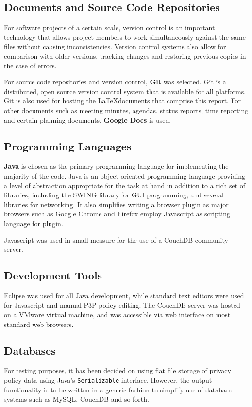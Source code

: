 \subsection{Documents and Source Code Repositories}
For software projects of a certain scale, version control is an important technology that allows project members to work simultaneously against the same files without causing inconsistencies. Version control systems also allow for comparison with older versions, tracking changes and restoring previous copies in the case of errors.

For source code repositories and version control, \textbf{Git} was selected. Git is a distributed, open source version control system that is available for all platforms. Git is also used for hosting the \LaTeX documents that comprise this report. For other documents such as meeting minutes, agendas, status reports, time reporting and certain planning documents, \textbf{Google Docs} is used.


\subsection{Programming Languages}
\textbf{Java} is chosen as the primary programming language for implementing the majority of the code. Java is an object oriented programming language providing a level of abstraction appropriate for the task at hand in addition to a rich set of libraries, including the SWING library for GUI programming, and several libraries for networking. It also simplifies writing a browser plugin as major browsers such as Google Chrome and Firefox employ Javascript as scripting language for plugin.

Javascript was used in small measure for the use of a CouchDB community server.

\subsection{Development Tools}
Eclipse was used for all Java development, while standard text editors were used for Javascript and manual P3P policy editing. The CouchDB server was hosted on a VMware virtual machine, and was accessible via web interface on most standard web browsers.

\subsection{Databases}
For testing purposes, it has been decided on using flat file storage of privacy policy data using Java's \texttt{Serializable} interface. However, the output functionality is to be written in a generic fashion to simplify use of database systems such as MySQL, CouchDB and so forth. 

